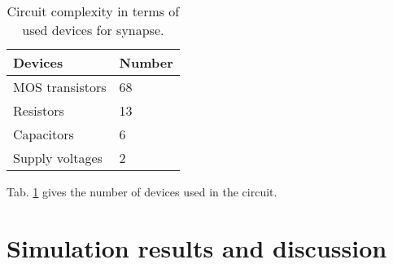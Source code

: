 \documentclass[review]{elsarticle}
\begin{document}
%

\begin{table}[]
\centering
\caption{Circuit complexity in terms of used devices for synapse.}
\label{table:res1}
\begin{tabular}{|l|l|}
 \hline
  Devices&  Number\\
 \hline
 MOS transistors& 68   \\
Resistors & 13  \\
 Capacitors& 6   \\
 Supply voltages& 2 \\
 \hline
 \end{tabular}
\end{table}

Tab. \ref{table:res1} gives the number of devices used in the circuit. 

\section{Simulation results and discussion}
\label{discuss}


\end{document}
